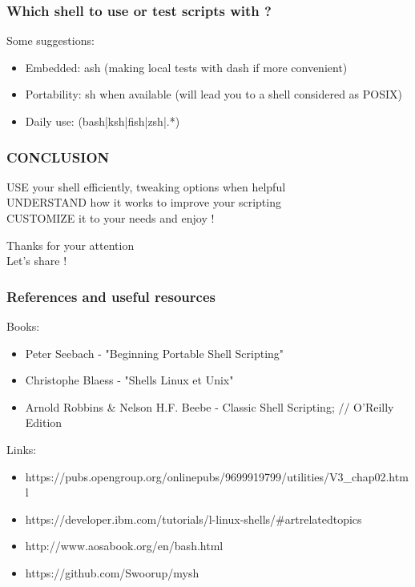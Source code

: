 \documentclass[aspectratio=169,10pt]{beamer}
\begin{document}
\begin{frame}[fragile]
  \frametitle{Which shell to use or test scripts with ?}

  Some suggestions:
  \vspace{\baselineskip}

    \begin{itemize}
        \item Embedded: ash (making local tests with dash if more convenient)
        \item Portability: sh when available (will lead you to a shell considered as POSIX)
        \item Daily use: (bash|ksh|fish|zsh|.*)
    \end{itemize}
\end{frame}


\begin{frame}
  \frametitle{CONCLUSION}
    \large{
  USE your shell efficiently, tweaking options when helpful \\
  \vspace{\baselineskip}
  UNDERSTAND how it works to improve your scripting \\
  \vspace{\baselineskip}
  CUSTOMIZE it to your needs and enjoy !
  }
\end{frame}

\begin{frame}[c]
    \begin{center}
        \Huge Thanks for your attention \\ \huge Let's share !
    \end{center}
\end{frame}

\begin{frame}
  \frametitle{References and useful resources}
Books:
    \begin{itemize}
\item Peter Seebach - "Beginning Portable Shell Scripting"
\item Christophe Blaess - "Shells Linux et Unix"
\item Arnold Robbins \& Nelson H.F. Beebe - Classic Shell Scripting; // O'Reilly Edition
    \end{itemize}

\vspace{\baselineskip}

Links:
    \begin{itemize}
        \item https://pubs.opengroup.org/onlinepubs/9699919799/utilities/V3\_chap02.html
        \item https://developer.ibm.com/tutorials/l-linux-shells/\#artrelatedtopics
        \item http://www.aosabook.org/en/bash.html
        \item https://github.com/Swoorup/mysh
    \end{itemize}
\end{frame}
\end{document}
